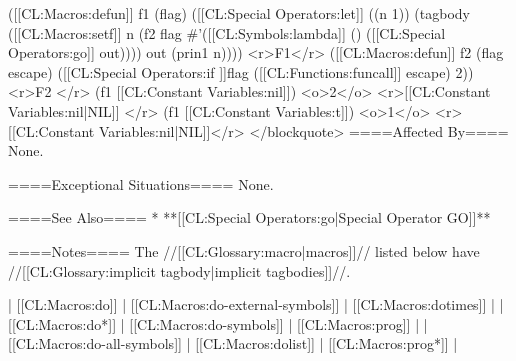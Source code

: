 ([[CL:Macros:defun]] f1 (flag) 
  ([[CL:Special Operators:let]] ((n 1)) 
    (tagbody 
       ([[CL:Macros:setf]] n (f2 flag #'([[CL:Symbols:lambda]] () ([[CL:Special Operators:go]] out)))) 
     out 
       (prin1 n)))) <r>F1</r>
([[CL:Macros:defun]] f2 (flag escape) 
  ([[CL:Special Operators:if ]]flag ([[CL:Functions:funcall]] escape) 2)) <r>F2 </r>
(f1 [[CL:Constant Variables:nil]])
<o>2</o>
<r>[[CL:Constant Variables:nil|NIL]] </r>
(f1 [[CL:Constant Variables:t]])
<o>1</o>
<r>[[CL:Constant Variables:nil|NIL]]</r>
</blockquote>
====Affected By====
None.

====Exceptional Situations====
None.

====See Also====
  * **[[CL:Special Operators:go|Special Operator GO]]**

====Notes====
The //[[CL:Glossary:macro|macros]]// listed below have //[[CL:Glossary:implicit tagbody|implicit tagbodies]]//.

| [[CL:Macros:do]]             | [[CL:Macros:do-external-symbols]] | [[CL:Macros:dotimes]] |
| [[CL:Macros:do*]]            | [[CL:Macros:do-symbols]]          | [[CL:Macros:prog]]    |
| [[CL:Macros:do-all-symbols]] | [[CL:Macros:dolist]]              | [[CL:Macros:prog*]]   |

